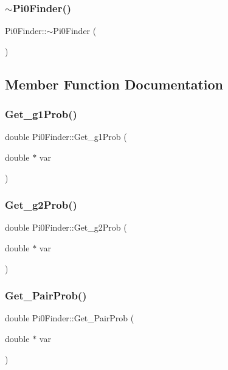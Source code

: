 \subsubsection{$\sim$\+Pi0\+Finder()}
{\footnotesize\ttfamily Pi0\+Finder\+::$\sim$\+Pi0\+Finder (\begin{DoxyParamCaption}{ }\end{DoxyParamCaption})}



\subsection{Member Function Documentation}
\mbox{\label{classlcfiplus_1_1Pi0Finder_ae301e4689495970060280c8405762098}} 
\subsubsection{Get\+\_\+g1\+Prob()}
{\footnotesize\ttfamily double Pi0\+Finder\+::\+Get\+\_\+g1\+Prob (\begin{DoxyParamCaption}\item[{double $\ast$}]{var }\end{DoxyParamCaption})}

\mbox{\label{classlcfiplus_1_1Pi0Finder_a81c3f9d715312292f795d96ec4992799}} 
\subsubsection{Get\+\_\+g2\+Prob()}
{\footnotesize\ttfamily double Pi0\+Finder\+::\+Get\+\_\+g2\+Prob (\begin{DoxyParamCaption}\item[{double $\ast$}]{var }\end{DoxyParamCaption})}

\mbox{\label{classlcfiplus_1_1Pi0Finder_a1975fe787a370cbaa4c9cdff467c1e93}} 
\subsubsection{Get\+\_\+\+Pair\+Prob()}
{\footnotesize\ttfamily double Pi0\+Finder\+::\+Get\+\_\+\+Pair\+Prob (\begin{DoxyParamCaption}\item[{double $\ast$}]{var }\end{DoxyParamCaption})}

